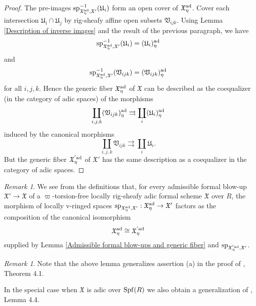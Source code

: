 \documentclass[12pt,twoside,a4paper]{article}
\theoremstyle{definition}
\theoremstyle{remark}
\newtheorem{rmk}[thm]{Remark}
\newcommand\ad{{\rm ad}}
\newcommand\spc{{\rm sp}}
\newcommand\Spf{{\rm Spf}}
\begin{document}
\begin{proof}
The pre-images $\spc_{\mathfrak{X}_{\eta}^{\ad},\mathfrak{X}'}^{-1}(\mathfrak{U}_{i})$ form an open cover of $\mathfrak{X}_{\eta}^{\ad}$. Cover each intersection $\mathfrak{U}_{i}\cap \mathfrak{U}_{j}$ by rig-sheafy affine open subsets $\mathfrak{V}_{ijk}$. Using Lemma \ref{Description of inverse images} and the result of the previous paragraph, we have \begin{equation*}\spc_{\mathfrak{X}_{\eta}^{\ad},\mathfrak{X}'}^{-1}(\mathfrak{U}_{i})=(\mathfrak{U}_{i})_{\eta}^{\ad}\end{equation*}and \begin{equation*}\spc_{\mathfrak{X}_{\eta}^{\ad},\mathfrak{X}'}^{-1}(\mathfrak{V}_{ijk})=(\mathfrak{V}_{ijk})_{\eta}^{\ad}\end{equation*}for all $i, j, k$. Hence the generic fiber $\mathfrak{X}_{\eta}^{\ad}$ of $\mathfrak{X}$ can be described as the coequalizer (in the category of adic spaces) of the morphisms\begin{equation*}\coprod_{i,j,k}(\mathfrak{V}_{ijk})_{\eta}^{\ad}\rightrightarrows \coprod_{i}(\mathfrak{U}_{i})_{\eta}^{\ad}\end{equation*}induced by the canonical morphisms\begin{equation*}\coprod_{i,j,k}\mathfrak{V}_{ijk}\rightrightarrows \coprod_{i}\mathfrak{U}_{i}.\end{equation*}But the generic fiber $\mathfrak{X}_{\eta}^{'\ad}$ of $\mathfrak{X}'$ has the same description as a coequalizer in the category of adic spaces.\end{proof} 
\begin{rmk}We see from the definitions that, for every admissible formal blow-up $\mathfrak{X}'\to \mathfrak{X}$ of a $\varpi$-torsion-free locally rig-sheafy adic formal scheme $\mathfrak{X}$ over $R$, the morphism of locally v-ringed spaces $\spc_{\mathfrak{X}_{\eta}^{\ad},\mathfrak{X}'}: \mathfrak{X}_{\eta}^{\ad}\to \mathfrak{X}'$ factors as the composition of the canonical isomorphism \begin{equation*}\mathfrak{X}_{\eta}^{\ad}\cong \mathfrak{X}_{\eta}^{'\ad}\end{equation*}supplied by Lemma \ref{Admissible formal blow-ups and generic fiber} and $\spc_{\mathfrak{X}_{\eta}^{'\ad},\mathfrak{X}'}$.\end{rmk}
\begin{rmk}Note that the above lemma generalizes assertion (a) in the proof of \cite{BL1}, Theorem 4.1.\end{rmk} 
In the special case when $\mathfrak{X}$ is adic over $\Spf(R)$ we also obtain a generalization of \cite{BL1}, Lemma 4.4.
\end{document}
